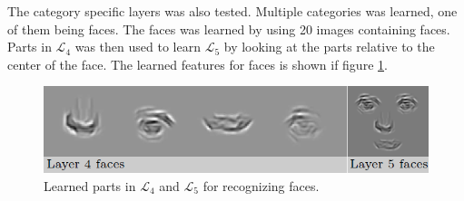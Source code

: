 The category specific layers was also tested. Multiple categories was learned, one of them being faces. 
The faces was learned by using 20 images containing faces. Parts in $\mathcal{L}_{4}$ was then used to learn $\mathcal{L}_{5}$ by  looking at the parts relative to the center of the face. 
The learned features for faces is shown if figure \ref{fig:layer4-5}.

\begin{figure}[h!] %
\centering
\includegraphics[scale=0.7]{graphics/layer4_5_faces}
\caption{Learned parts in $\mathcal{L}_{4}$ and $\mathcal{L}_{5}$ for recognizing faces. }
\label{fig:layer4-5}
\end{figure}

